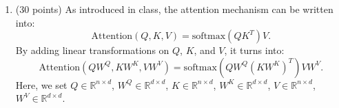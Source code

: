 \documentclass[11pt]{article}
\begin{document}
\begin{enumerate}




    \item (30 points) As introduced in class, the attention mechanism can be written into:
    $$\mbox{Attention}(Q,K,V)=\mbox{softmax}(QK^T)V.$$
    By adding linear transformations on $Q$, $K$, and $V$, it turns into:
    $$\mbox{Attention}(QW^Q,KW^K,VW^V)=\mbox{softmax}(QW^Q(KW^K)^T)VW^V.$$
    Here, we set $Q \in \mathbb{R}^{n \times d}$, $W^Q \in \mathbb{R}^{d \times d}$, $K \in \mathbb{R}^{n \times d}$, $W^K \in \mathbb{R}^{d \times d}$, $V \in \mathbb{R}^{n \times d}$, $W^V \in \mathbb{R}^{d \times d}$.


\end{enumerate}
\end{document}
